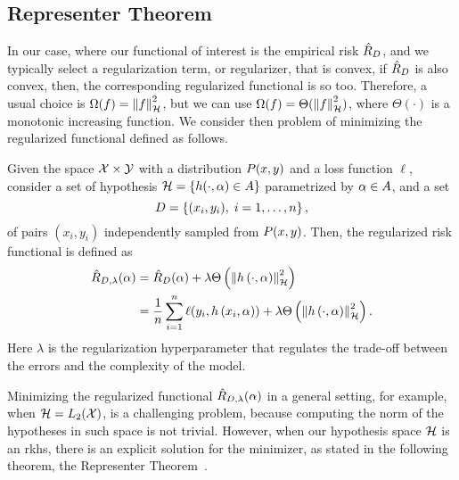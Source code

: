 \subsection{Representer Theorem} %
%
In our case, where our functional of interest is the empirical risk $\hat{R}_{D}$, and we typically select a regularization term, or regularizer, that is convex, if $\hat{R}_{D}$ is also convex, then, the corresponding regularized functional is so too. Therefore, a usual choice is $\Omega(f) = \left\lVert f\right\rVert^2_{\mathcal{H}}$, but we can use $\Omega(f) = \Theta(\left\lVert f\right\rVert_{\mathcal{H}}^2)$, where $\Theta(\cdot)$ is a monotonic increasing function.
We consider then problem of minimizing the regularized functional defined as follows.
\begin{definition}
    Given the space $\mathcal{X} \times \mathcal{Y}$ with a distribution $P(x, y)$ and a loss function $\ell$, consider a set of hypothesis $\mathcal{H} = \left\{h(\cdot, \alpha) \in A\right\}$ parametrized by $\alpha \in A$, and a set 
    \begin{equation}
        \nonumber
        D = \left\{(x_i, y_i), \; i=1, \ldots, n\right\} ,
    \end{equation}
    of pairs $(x_i, y_i)$ independently sampled from $P(x, y)$.   
    Then, the regularized risk functional is defined as
    \begin{equation}
        \label{eq:regrisk_def}
        \begin{aligned}
            \regrisk(\param) &= \emprisk(\param) + \lambda \Theta\left(\norm{\hyp{\cdot}{\param}}^2_\hypspace \right) \\
            &= \frac{1}{\nsamples} \sum_{i=1}^\nsamples \ell(y_i, \hyp{x_i}{\param}) + \lambda \Theta\left(\norm{\hyp{\cdot}{\param}}^2_\hypspace \right) .
        \end{aligned}        
    \end{equation}
    Here $\lambda$ is the regularization hyperparameter that regulates the trade-off between the errors and the complexity of the model.
\end{definition}
%
Minimizing the regularized functional $\hat{R}_{D, \lambda}(\alpha)$ in a general setting, for example, when $\mathcal{H} = L_2(\mathcal{X})$, is a challenging problem, because computing the norm of the hypotheses in such space is not trivial.
%
However, when our hypothesis space $\mathcal{H}$ is an \acrshort{rkhs}, there is an explicit solution for the minimizer, as stated in the following theorem, the Representer Theorem~\citep{ScholkopfHS01}.
